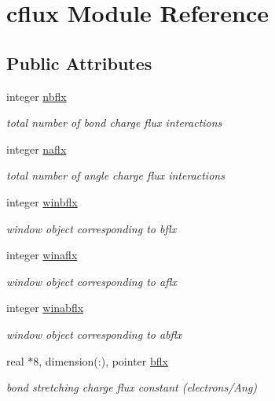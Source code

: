 \hypertarget{classcflux}{\section{cflux Module Reference}
\label{classcflux}
}
\subsection*{Public Attributes}
\begin{DoxyCompactItemize}
\item 
integer \hyperlink{classcflux_a0d23ad3961edc2c3a554c3f612d7eaff}{nbflx}
\begin{DoxyCompactList}\small\item\em total number of bond charge flux interactions \end{DoxyCompactList}\item 
integer \hyperlink{classcflux_a14d709ce722049e7bd80e2c8c0bd69a8}{naflx}
\begin{DoxyCompactList}\small\item\em total number of angle charge flux interactions \end{DoxyCompactList}\item 
integer \hyperlink{classcflux_a1a02e1cdf1c9a0d2dc4956b2f726c5ac}{winbflx}
\begin{DoxyCompactList}\small\item\em window object corresponding to bflx \end{DoxyCompactList}\item 
integer \hyperlink{classcflux_a004ab716c2eccb822cb513fc593a9d37}{winaflx}
\begin{DoxyCompactList}\small\item\em window object corresponding to aflx \end{DoxyCompactList}\item 
integer \hyperlink{classcflux_a48598280236f2e19830c02fcc740cc67}{winabflx}
\begin{DoxyCompactList}\small\item\em window object corresponding to abflx \end{DoxyCompactList}\item 
real $\ast$8, dimension(\-:), pointer \hyperlink{classcflux_a9a62279c5b16a88b814e755246c30a78}{bflx}
\begin{DoxyCompactList}\small\item\em bond stretching charge flux constant (electrons/\-Ang) \end{DoxyCompactList}\item 

\end{DoxyCompactItemize}

